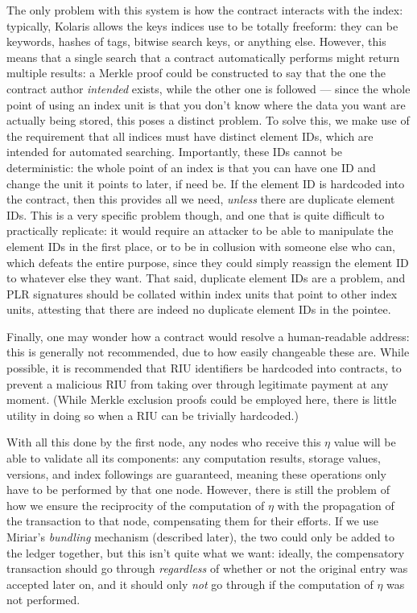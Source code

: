 \documentclass{extreport}
\begin{document}
The only problem with this system is how the contract interacts with the index: typically, Kolaris allows the keys indices use to be totally freeform: they can be keywords, hashes of tags, bitwise search keys, or anything else. However, this means that a single search that a contract automatically performs might return multiple results: a Merkle proof could be constructed to say that the one the contract author \emph{intended} exists, while the other one is followed --- since the whole point of using an index unit is that you don't know where the data you want are actually being stored, this poses a distinct problem. To solve this, we make use of the requirement that all indices must have distinct element IDs, which are intended for automated searching. Importantly, these IDs cannot be deterministic: the whole point of an index is that you can have one ID and change the unit it points to later, if need be. If the element ID is hardcoded into the contract, then this provides all we need, \emph{unless} there are duplicate element IDs. This is a very specific problem though, and one that is quite difficult to practically replicate: it would require an attacker to be able to manipulate the element IDs in the first place, or to be in collusion with someone else who can, which defeats the entire purpose, since they could simply reassign the element ID to whatever else they want. That said, duplicate element IDs are a problem, and PLR signatures should be collated within index units that point to other index units, attesting that there are indeed no duplicate element IDs in the pointee.

Finally, one may wonder how a contract would resolve a human-readable address: this is generally not recommended, due to how easily changeable these are. While possible, it is recommended that RIU identifiers be hardcoded into contracts, to prevent a malicious RIU from taking over through legitimate payment at any moment. (While Merkle exclusion proofs could be employed here, there is little utility in doing so when a RIU can be trivially hardcoded.)

With all this done by the first node, any nodes who receive this \(\eta\) value will be able to validate all its components: any computation results, storage values, versions, and index followings are guaranteed, meaning these operations only have to be performed by that one node. However, there is still the problem of how we ensure the reciprocity of the computation of \(\eta\) with the propagation of the transaction to that node, compensating them for their efforts. If we use Miriar's \emph{bundling} mechanism (described later), the two could only be added to the ledger together, but this isn't quite what we want: ideally, the compensatory transaction should go through \emph{regardless} of whether or not the original entry was accepted later on, and it should only \emph{not} go through if the computation of \(\eta\) was not performed.
\end{document}
